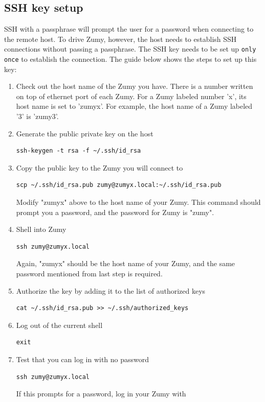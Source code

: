 \documentclass{article}
\begin{document}
\subsection{SSH key setup}
SSH with a passphrase will prompt the user for a password when connecting to the remote host. To drive Zumy, however, the host needs to establish SSH connections without passing a passphrase. The SSH key needs to be set up \verb=only once= to establish the connection. The guide below shows the steps to set up this key:

\begin{enumerate}
\item Check out the host name of the Zumy you have. There is a number written on top of ethernet port of each Zumy. For a Zumy labeled number 'x', its host name is set to 'zumyx'. For example, the host name of a Zumy labeled '3' is 'zumy3'.
\item Generate the public private key on the host
\begin{Verbatim}[frame=single]
ssh-keygen -t rsa -f ~/.ssh/id_rsa
\end{Verbatim}
\item Copy the public key to the Zumy you will connect to
\begin{Verbatim}[frame=single]
scp ~/.ssh/id_rsa.pub zumy@zumyx.local:~/.ssh/id_rsa.pub
\end{Verbatim}
Modify "zumyx" above to the host name of your Zumy. This command should prompt you a password, and the password for Zumy is "zumy".
\item Shell into Zumy
\begin{Verbatim}[frame=single]
ssh zumy@zumyx.local
\end{Verbatim}
Again, "zumyx" should be the host name of your Zumy, and the same password mentioned from last step is required.
\item Authorize the key by adding it to the list of authorized keys
\begin{Verbatim}[frame=single]
cat ~/.ssh/id_rsa.pub >> ~/.ssh/authorized_keys
\end{Verbatim}
\item Log out of the current shell
\begin{Verbatim}[frame=single]
exit
\end{Verbatim}
\item Test that you can log in with no password
\begin{Verbatim}[frame=single]
ssh zumy@zumyx.local
\end{Verbatim}
If this prompts for a password, log in your Zumy with

\end{enumerate}
\end{document}
